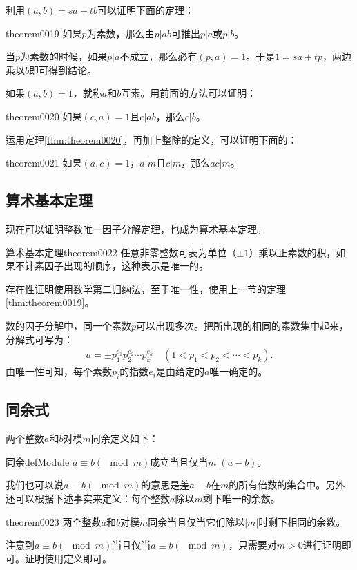 利用$(a, b) = sa+tb$可以证明下面的定理：
\begin{theorem}{}{theorem0019}
如果$p$为素数，那么由$p|ab$可推出$p|a$或$p|b$。
\end{theorem}

当$p$为素数的时候，如果$p|a$不成立，那么必有$(p, a)=1$。于是$1 = sa+tp$，两边乘以$b$即可得到结论。

如果$(a, b)=1$，就称$a$和$b$互素。用前面的方法可以证明：
\begin{theorem}{}{theorem0020}
如果$(c, a)=1$且$c|ab$，那么$c|b$。
\end{theorem}

运用定理\ref{thm:theorem0020}，再加上整除的定义，可以证明下面的：
\begin{theorem}{}{theorem0021}
如果$(a, c)=1$，$a|m$且$c|m$，那么$ac|m$。
\end{theorem}

\subsection{算术基本定理}
现在可以证明整数唯一因子分解定理，也成为算术基本定理。
\begin{theorem}{算术基本定理}{theorem0022}
任意非零整数可表为单位（$\pm{}1$）乘以正素数的积，如果不计素因子出现的顺序，这种表示是唯一的。
\end{theorem}

存在性证明使用数学第二归纳法，至于唯一性，使用上一节的定理\ref{thm:theorem0019}。

数的因子分解中，同一个素数$p$可以出现多次。把所出现的相同的素数集中起来，分解式可写为：
\begin{gather}\label{equation0015}
a = \pm{}p_1^{e_1}p_2^{e_2} \cdots p_k^{e_k} \quad (1 < p_1 < p_2 < \cdots < p_k).
\end{gather}
由唯一性可知，每个素数$p_i$的指数$e_i$是由给定的$a$唯一确定的。

\subsection{同余式}
两个整数$a$和$b$对模$m$同余定义如下：
\begin{definition}{同余}{defModule}
$a \equiv b (\mod{m})$成立当且仅当$m|(a-b)$。
\end{definition}
我们也可以说$a \equiv b(\mod{m})$的意思是差$a-b$在$m$的所有倍数的集合中。另外还可以根据下述事实来定义：每个整数$a$除以$m$剩下唯一的余数。
\begin{theorem}{}{theorem0023}
两个整数$a$和$b$对模$m$同余当且仅当它们除以$|m|$时剩下相同的余数。
\end{theorem}
注意到$a \equiv b(\mod{m})$当且仅当$a \equiv b(\mod{m})$，只需要对$m>0$进行证明即可。证明使用定义即可。

